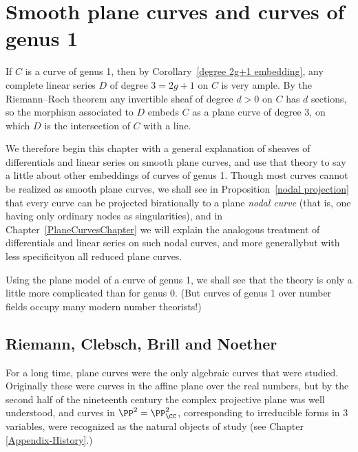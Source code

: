 
\chapter{Smooth plane curves and curves of genus 1}\label{3b}\label{genus 1 chapter}

If $C$ is a
curve of genus 1, then by Corollary~\ref{degree 2g+1 embedding}, any complete linear series $D$ of
%
degree $3 = 2g+1$ on $C$ is very ample. By the Riemann--Roch theorem any invertible sheaf
of degree $d>0$ on $C$ has $d$ sections, so the morphism associated to $D$ embeds $C$
as a plane curve of degree 3, on which $D$ is the intersection of $C$ with a line.

We therefore begin this chapter with a general explanation of
%
sheaves of differentials and linear
series on smooth plane curves, and use that theory to say a little about other embeddings of
curves of genus 1. Though most curves cannot be realized as smooth plane curves, we shall see
in Proposition~\ref{nodal projection} that every curve can be
projected birationally to a plane
\textit{nodal curve}
%
(that is, one having only ordinary nodes as singularities),
and in Chapter~\ref{PlaneCurvesChapter} we will
explain the analogous treatment of differentials and linear series on
such
nodal curves, and more
generally\emdash but with less specificity\emdash on all reduced plane curves.

Using the plane model of a curve of genus 1, we shall see that the
theory is only a little more complicated than for genus 0. (But curves
of genus 1 over number fields
occupy
many modern number theorists!)


\section{Riemann, Clebsch, Brill and Noether}
For a long time,
plane curves
%
were the only algebraic curves that were
studied. Originally these were curves in the affine plane over the
real numbers, but by the second half of the
nineteenth
century the complex
projective plane was well understood, and curves in $\PP^2 =
\PP^2_\CC$, corresponding to irreducible forms in 3 variables, were
recognized as the natural objects of study (see Chapter \ref{Appendix-History}.)

